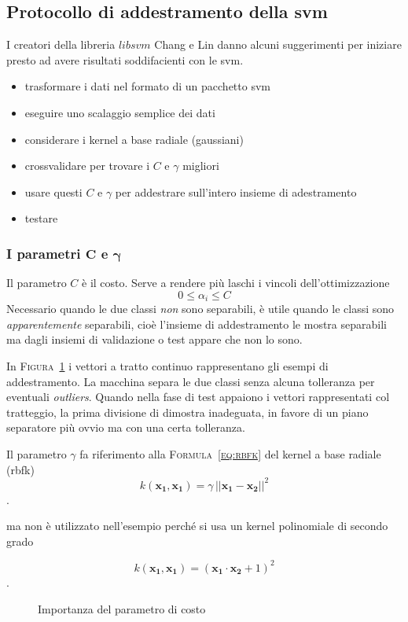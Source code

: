 \subsection {Protocollo di addestramento della \ac{svm}}
I creatori della libreria $libsvm$ Chang e Lin
danno alcuni suggerimenti
per iniziare presto ad avere risultati soddifacienti con le \ac{svm}.
\begin{itemize}
  \item {trasformare i dati nel formato di un pacchetto svm}
  \item {eseguire uno scalaggio semplice dei dati}
  \item {considerare i kernel a base radiale (gaussiani)}
  \item {crossvalidare per trovare i $C$ e $\gamma$ migliori}
  \item {usare questi $C$ e $\gamma$ per addestrare sull'intero insieme di adestramento}
  \item {testare}
\end{itemize}

\subsubsection {I parametri $\mathbf{C}$ e $\mathbf{\gamma}$}
Il parametro $C$ \`e il costo.
Serve a rendere pi\`u laschi i vincoli dell'ottimizzazione
\begin{equation}
  \label{eq:vincoliC}
  0 \leq \alpha_i \leq C
\end{equation}
Necessario quando le due classi \emph{non} sono separabili,
\`e utile quando le classi sono \textit{apparentemente} separabili,
cio\`e l'insieme di addestramento le mostra separabili
ma dagli insiemi di validazione o test appare che non lo sono.

In \textsc{Figura~\ref{fig:costo}} i vettori a tratto continuo
rappresentano gli esempi di addestramento.
La macchina separa le due classi senza alcuna tolleranza per eventuali \textit{outliers}.
Quando nella fase di test appaiono i vettori rappresentati col tratteggio, la prima divisione di dimostra inadeguata, in favore di un piano separatore più ovvio ma con una certa tolleranza.


Il parametro $\gamma$ fa riferimento alla \textsc{Formula~\ref{eq:rbfk}} del kernel a base radiale (\ac{rbfk})
\begin{equation}
  \label{eq:rbfk}
  k(\boldsymbol{x_1}, \boldsymbol{x_1}) = 
    \gamma\,||\boldsymbol{x_1}-\boldsymbol{x_2}||^2
\end{equation}.

ma non \`e utilizzato nell'esempio
perch\'e si usa  un kernel polinomiale di secondo grado

\begin{equation}
  \label{eq:rbfk}
  k(\boldsymbol{x_1}, \boldsymbol{x_1}) = 
    (\boldsymbol{x_1}\cdot\boldsymbol{x_2} +1)^2
\end{equation}.



\begin{figure}
\centering

\caption{Importanza del parametro di costo}
\label{fig:costo}
\end{figure}
